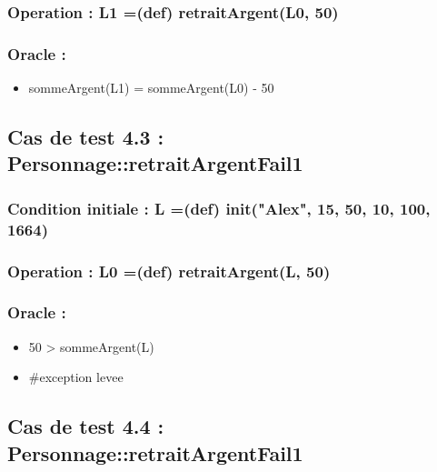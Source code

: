 \documentclass[11pt]{article}
\begin{document}
\subsubsection{Operation : L1 =(def) retraitArgent(L0, 50)}
\label{sec-1.10.2}

\subsubsection{Oracle :}
\label{sec-1.10.3}

\begin{itemize}

\item sommeArgent(L1) = sommeArgent(L0) - 50\\
\label{sec-1.10.3.1}


\end{itemize} %
\subsection{Cas de test 4.3 : Personnage::retraitArgentFail1}
\label{sec-1.11}

\subsubsection{Condition initiale :  L =(def) init("Alex", 15, 50, 10, 100, 1664)}
\label{sec-1.11.1}

\subsubsection{Operation : L0 =(def) retraitArgent(L, 50)}
\label{sec-1.11.2}

\subsubsection{Oracle :}
\label{sec-1.11.3}

\begin{itemize}

\item 50 > sommeArgent(L)\\
\label{sec-1.11.3.1}


\item \#exception levee\\
\label{sec-1.11.3.2}


\end{itemize} %
\subsection{Cas de test 4.4 : Personnage::retraitArgentFail1}
\label{sec-1.12}
\end{document}
